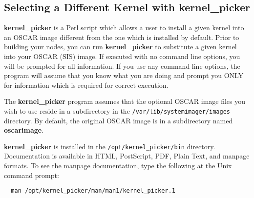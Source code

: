 
\subsection{Selecting a Different Kernel with kernel\_picker}
\label{app:kernel\_picker-overview}

{\bf kernel\_picker} is a Perl script which allows a user to install a given
kernel into an OSCAR image different from the one which is installed by
default.  Prior to building your nodes, you can run {\bf kernel\_picker} to
substitute a given kernel into your OSCAR (SIS) image.  If executed with no
command line options, you will be prompted for all information.  If you use
any command line options, the program will assume that you know what you
are doing and prompt you ONLY for information which is required for
correct execution.

The {\bf kernel\_picker} program assumes that the optional OSCAR image files
you wish to use reside in a subdirectory in the 
{\tt /var/lib/systemimager/images} directory.  By default, the original
OSCAR image is in a subdirectory named {\bf oscarimage}.

{\bf kernel\_picker} is installed in the {\tt /opt/kernel\_picker/bin}
directory.  Documentation is available in HTML, PostScript, PDF, Plain Text,
and manpage formats.  To see the manpage documentation, type the following
at the Unix command prompt:

\begin{verbatim}
  man /opt/kernel_picker/man/man1/kernel_picker.1
\end{verbatim}

